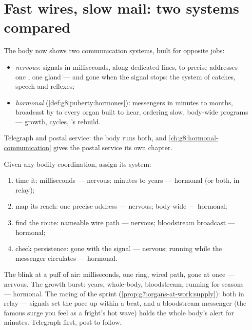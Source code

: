 \section{Fast wires, slow mail: two systems compared}

\begin{proposition}\label{prop:g8:nervous-communication:compare}
The body now shows two communication systems, built for
opposite jobs:
\begin{itemize}
  \item \emph{nervous}: signals in milliseconds, along
        dedicated lines, to precise addresses --- one
        , one gland --- and gone when the signal
        stops: the system of catches, speech and
        reflexes;
  \item \emph{hormonal}
        (\cref{def:g8:puberty:hormones}): messengers in
        minutes to months, broadcast by  to every
        organ built to hear, ordering slow, body-wide
        programs --- growth, cycles, 's rebuild.
\end{itemize}
Telegraph and postal service: the body runs both, and
\cref{ch:g8:hormonal-communication} gives the postal
service its own chapter.
\end{proposition}
\admitted

\begin{method}\label{met:g8:nervous-communication:diagnose}
Given any bodily coordination, assign its system:
\begin{enumerate}
  \item time it: milliseconds --- nervous; minutes to
        years --- hormonal (or both, in relay);
  \item map its reach: one precise address --- nervous;
        body-wide --- hormonal;
  \item find the route: nameable wire path --- nervous;
        bloodstream broadcast --- hormonal;
  \item check persistence: gone with the signal ---
        nervous; running while the messenger circulates
        --- hormonal.
\end{enumerate}
\end{method}

\begin{example}\label{ex:g8:nervous-communication:cases}
The blink at a puff of air: milliseconds, one 
ring, wired path, gone at once --- nervous. The growth
burst: years, whole-body, bloodstream, running for
seasons --- hormonal. The racing  of the sprint
(\cref{prop:g7:organs-at-work:supply}): both in relay ---
 signals set the pace up within a beat, and a
bloodstream messenger (the famous surge you feel as a
fright's hot wave) holds the whole body's alert for
minutes. Telegraph first, post to follow.
\end{example}

